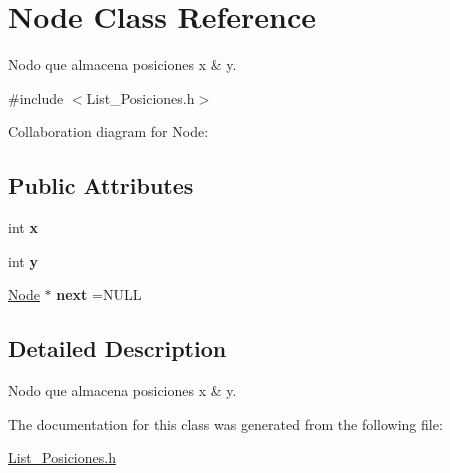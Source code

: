 \hypertarget{classNode}{}\section{Node Class Reference}
\label{classNode}


Nodo que almacena posiciones x \& y.  




{\ttfamily \#include $<$List\+\_\+\+Posiciones.\+h$>$}



Collaboration diagram for Node\+:
\subsection*{Public Attributes}
\begin{DoxyCompactItemize}
\item 
\mbox{\label{classNode_aff1029a518bdc2651007b8856f958364}} 
int {\bfseries x}
\item 
\mbox{\label{classNode_aa3e5b5240023b4528ae85057b3324202}} 
int {\bfseries y}
\item 
\mbox{\label{classNode_a2559a716f69ccaa76d648d9f1b83065e}} 
\hyperlink{classNode}{Node} $\ast$ {\bfseries next} =N\+U\+LL
\end{DoxyCompactItemize}


\subsection{Detailed Description}
Nodo que almacena posiciones x \& y. 

The documentation for this class was generated from the following file\+:\begin{DoxyCompactItemize}
\item 
\hyperlink{List__Posiciones_8h}{List\+\_\+\+Posiciones.\+h}\end{DoxyCompactItemize}
